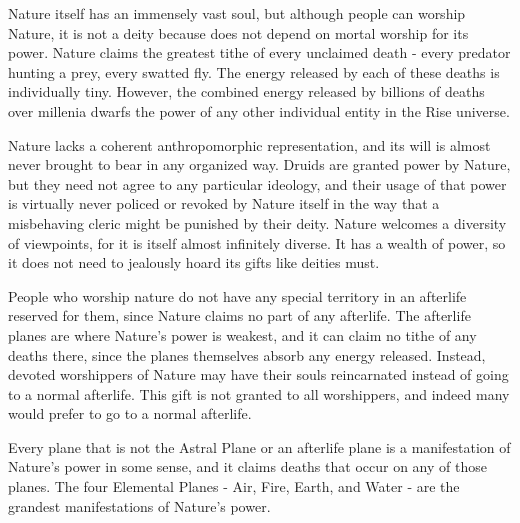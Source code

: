       Nature itself has an immensely vast soul, but although people can worship Nature, it is not a deity because does not depend on mortal worship for its power.
      Nature claims the greatest tithe of every unclaimed death - every predator hunting a prey, every swatted fly.
      The energy released by each of these deaths is individually tiny.
      However, the combined energy released by billions of deaths over millenia dwarfs the power of any other individual entity in the Rise universe.

      Nature lacks a coherent anthropomorphic representation, and its will is almost never brought to bear in any organized way.
      Druids are granted power by Nature, but they need not agree to any particular ideology, and their usage of that power is virtually never policed or revoked by Nature itself in the way that a misbehaving cleric might be punished by their deity.
      Nature welcomes a diversity of viewpoints, for it is itself almost infinitely diverse.
      It has a wealth of power, so it does not need to jealously hoard its gifts like deities must.

      People who worship nature do not have any special territory in an afterlife reserved for them, since Nature claims no part of any afterlife.
      The afterlife planes are where Nature's power is weakest, and it can claim no tithe of any deaths there, since the planes themselves absorb any energy released.
      Instead, devoted worshippers of Nature may have their souls reincarnated instead of going to a normal afterlife.
      This gift is not granted to all worshippers, and indeed many would prefer to go to a normal afterlife.

      Every plane that is not the Astral Plane or an afterlife plane is a manifestation of Nature's power in some sense, and it claims deaths that occur on any of those planes.
      The four Elemental Planes - Air, Fire, Earth, and Water - are the grandest manifestations of Nature's power.

